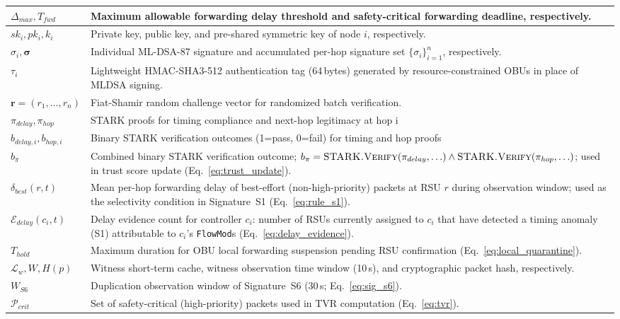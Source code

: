 \documentclass[12pt, a4paper]{report}
\begin{document}
\begin{longtable}{|m{5.0cm}|m{9.0cm}|}
\hline
$\Delta_{max}, T_{fwd}$ & Maximum allowable forwarding delay threshold and safety-critical forwarding deadline, respectively. \\
\hline
$sk_i, pk_i, k_i$ & Private key, public key, and pre-shared symmetric key of node $i$, respectively. \\
\hline
$\sigma_i, \boldsymbol{\sigma}$ & Individual ML-DSA-87 signature and accumulated per-hop signature set $\{\sigma_i\}_{i=1}^n$, respectively. \\
\hline
$\tau_i$ & Lightweight HMAC-SHA3-512 authentication tag (64\,bytes) generated by resource-constrained \ac{OBU}s in place of \ac{MLDSA} signing. \\
\hline
$\mathbf{r} = (r_1, \ldots, r_n)$ & Fiat-Shamir random challenge vector for randomized batch verification. \\
\hline
$\pi_{delay}, \pi_{hop}$ & STARK proofs for timing compliance and next-hop legitimacy at hop i \\
\hline
$b_{delay,i}, b_{hop,i}$ & Binary STARK verification outcomes (1=pass, 0=fail) for timing and hop proofs \\
\hline
$b_\pi$ & Combined binary STARK verification outcome; $b_\pi = \textsc{STARK.Verify}(\pi_{delay},\ldots) \land \textsc{STARK.Verify}(\pi_{hop},\ldots)$; used in trust score update (Eq.~\ref{eq:trust_update}). \\
\hline
$\delta_{best}(r,t)$ & Mean per-hop forwarding delay of best-effort (non-high-priority) packets at \ac{RSU} $r$ during observation window; used as the selectivity condition in Signature~S1 (Eq.~\ref{eq:rule_s1}). \\
\hline
$\mathcal{E}_{delay}(c_i,t)$ & Delay evidence count for controller $c_i$: number of \ac{RSU}s currently assigned to $c_i$ that have detected a timing anomaly (S1) attributable to $c_i$'s \texttt{FlowMod}s (Eq.~\ref{eq:delay_evidence}). \\
\hline
$T_{hold}$ & Maximum duration for \ac{OBU} local forwarding suspension pending \ac{RSU} confirmation (Eq.~\ref{eq:local_quarantine}). \\
\hline
$\mathcal{L}_w, W, H(p)$ & Witness short-term cache, witness observation time window (10\,s), and cryptographic packet hash, respectively. \\
\hline
$W_{S6}$ & Duplication observation window of Signature~S6 (30\,s; Eq.~\ref{eq:sig_s6}). \\
\hline
$\mathcal{P}_{crit}$ & Set of safety-critical (high-priority) packets used in TVR computation (Eq.~\ref{eq:tvr}). \\

\end{longtable}
\end{document}
